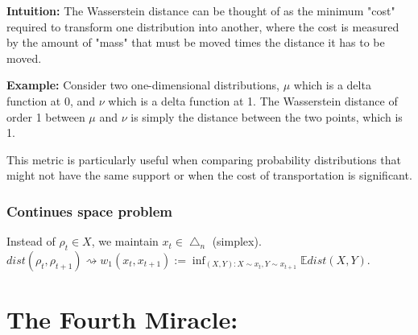 \documentclass[11pt]{book} %
\begin{document}
\textbf{Intuition:} The Wasserstein distance can be thought of as the minimum "cost" required to transform one distribution into another, 
where the cost is measured by the amount of "mass" that must be moved times the distance it has to be moved.

\textbf{Example:} Consider two one-dimensional distributions, \( \mu \) which is a delta function at 0, 
and \( \nu \) which is a delta function at 1. The Wasserstein distance of order 1 between \( \mu \) and \( \nu \) is simply the distance between the two points, which is 1.

This metric is particularly useful when comparing probability distributions that might not have the same support or when the cost of transportation is significant.


\subsection{Continues space problem}


Instead of $\rho_t \in X$, we maintain $x_t \in \bigtriangleup_n$ (simplex). \\
$dist(\rho_t, \rho_{t+1}) \rightsquigarrow w_1(x_t, x_{t+1}) := \inf_{(X, Y) : X \sim x_t, Y \sim x_{t+1}} \mathbb{E} dist(X, Y)$.








\chapter{The Fourth Miracle: }
\end{document}

